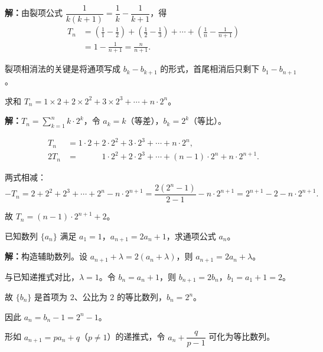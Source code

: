 \documentclass[12pt, a4paper]{ctexart}
\begin{document}
\noindent\textbf{解：}由裂项公式 $\dfrac{1}{k(k+1)} = \dfrac{1}{k} - \dfrac{1}{k+1}$，得
\begin{align*}
  T_n &= \left(\frac{1}{1} - \frac{1}{2}\right) + \left(\frac{1}{2} - \frac{1}{3}\right) + \cdots + \left(\frac{1}{n} - \frac{1}{n+1}\right)\\[4pt]
      &= 1 - \frac{1}{n+1} = \frac{n}{n+1}.
\end{align*}

\begin{tipbox}[方法总结]
裂项相消法的关键是将通项写成 $b_k - b_{k+1}$ 的形式，首尾相消后只剩下 $b_1 - b_{n+1}$。
\end{tipbox}

\begin{examplebox}[【例题6】错位相减法]
求和 $T_n = 1 \times 2 + 2 \times 2^2 + 3 \times 2^3 + \cdots + n \cdot 2^n$。
\end{examplebox}

\noindent\textbf{解：}$T_n = \displaystyle\sum_{k=1}^{n} k \cdot 2^k$，令 $a_k = k$（等差），$b_k = 2^k$（等比）。

\begin{align*}
  T_n &= 1 \cdot 2 + 2 \cdot 2^2 + 3 \cdot 2^3 + \cdots + n \cdot 2^n,\\
  2T_n &= \phantom{1 \cdot 2 + } 1 \cdot 2^2 + 2 \cdot 2^3 + \cdots + (n-1) \cdot 2^n + n \cdot 2^{n+1}.
\end{align*}

两式相减：
\[
  -T_n = 2 + 2^2 + 2^3 + \cdots + 2^n - n \cdot 2^{n+1} = \frac{2(2^n - 1)}{2 - 1} - n \cdot 2^{n+1} = 2^{n+1} - 2 - n \cdot 2^{n+1}.
\]

故 $T_n = (n-1) \cdot 2^{n+1} + 2$。

\begin{examplebox}[【例题7】递推数列求通项]
已知数列 $\{a_n\}$ 满足 $a_1 = 1$，$a_{n+1} = 2a_n + 1$，求通项公式 $a_n$。
\end{examplebox}

\noindent\textbf{解：}构造辅助数列。设 $a_{n+1} + \lambda = 2(a_n + \lambda)$，则 $a_{n+1} = 2a_n + \lambda$。

与已知递推式对比，$\lambda = 1$。令 $b_n = a_n + 1$，则 $b_{n+1} = 2b_n$，$b_1 = a_1 + 1 = 2$。

故 $\{b_n\}$ 是首项为 $2$、公比为 $2$ 的等比数列，$b_n = 2^n$。

因此 $a_n = b_n - 1 = 2^n - 1$。

\begin{tipbox}[方法总结]
形如 $a_{n+1} = pa_n + q$（$p \neq 1$）的递推式，令 $a_n + \dfrac{q}{p-1}$ 可化为等比数列。
\end{tipbox}
\end{document}

